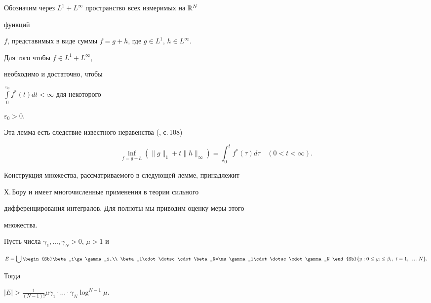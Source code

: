  


Обозначим через $L^1+L^\infty$ пространство всех измеримых на $\Bbb R^N$


функций 


$f$, представимых в виде суммы $f=g+h$, где $g\in L^1$, $h\in L^\infty$. 


 


\begin{lem} Для того чтобы $f\in L^1+L^\infty$, 


необходимо и достаточно, чтобы 


$\int\limits_0^{\varepsilon_0}f^*(t)dt<\infty$ для некоторого 


$\varepsilon_0>0$. 


\end{lem} 


 


Эта лемма есть следствие известного неравенства (\cite{Kre}, с.\,108) 


$$ 


\inf_{f=g+h}(\|g\|_1+t\|h\|_\infty)=\int_0^t f^*(\tau)d\tau\quad 


(0<t<\infty). 


$$ 


 


Конструкция множества, рассматриваемого в следующей лемме, принадлежит 


Х.\,Бору и имеет многочисленные применения в теории сильного 


дифференцирования интегралов. Для полноты мы приводим оценку меры этого 


множества. 


 


\begin{lem} Пусть числа $\gamma_1,\dotsc,\gamma_N>0$, $\mu>1$ и 


$$ 


E=\bigcup 


\begin{Sb}\beta_i\ge\gamma_i,\\ 


\beta_1\cdot\dotsc\cdot\beta_N=\mu\gamma_1\cdot\dotsc\cdot\gamma_N 


\end{Sb} 


\{y:0\le y_i\le\beta_i, \ i=1,\dotsc,N\}. 


$$ 


Тогда 


$|E|>\frac{1}{(N-1)!}\mu\gamma_1\cdot\dotsc\cdot\gamma_N\log^{N-1}\mu$. 


\end{lem} 


